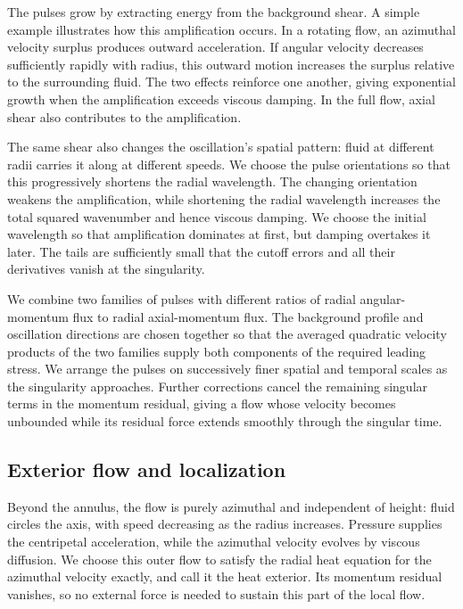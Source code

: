 The pulses grow by extracting energy from the background shear. A simple example
illustrates how this amplification occurs. In a rotating flow, an azimuthal velocity surplus
produces outward acceleration. If angular velocity decreases sufficiently rapidly with radius,
this outward motion increases the surplus relative to the surrounding fluid. The two effects
reinforce one another, giving exponential growth when the amplification exceeds viscous
damping. In the full flow, axial shear also contributes to the amplification.

The same shear also changes the oscillation's spatial pattern: fluid at different radii carries
it along at different speeds. We choose the pulse orientations so that this progressively
shortens the radial wavelength. The changing orientation weakens the amplification, while
shortening the radial wavelength increases the total squared wavenumber and hence viscous
damping. We choose the initial wavelength so that amplification dominates at first, but
damping overtakes it later. The tails are sufficiently small that the cutoff errors and all their
derivatives vanish at the singularity.

We combine two families of pulses with different ratios of radial angular-momentum
flux to radial axial-momentum flux. The background profile and oscillation directions are
chosen together so that the averaged quadratic velocity products of the two families supply
both components of the required leading stress. We arrange the pulses on successively finer
spatial and temporal scales as the singularity approaches. Further corrections cancel the
remaining singular terms in the momentum residual, giving a flow whose velocity becomes
unbounded while its residual force extends smoothly through the singular time.

\subsection{Exterior flow and localization}\label{sec:2.3}
Beyond the annulus, the flow is purely azimuthal and
independent of height: fluid circles the axis, with speed decreasing as the radius increases.
Pressure supplies the centripetal acceleration, while the azimuthal velocity evolves by viscous
diffusion. We choose this outer flow to satisfy the radial heat equation for the azimuthal
velocity exactly, and call it the heat exterior. Its momentum residual vanishes, so no external
force is needed to sustain this part of the local flow.

